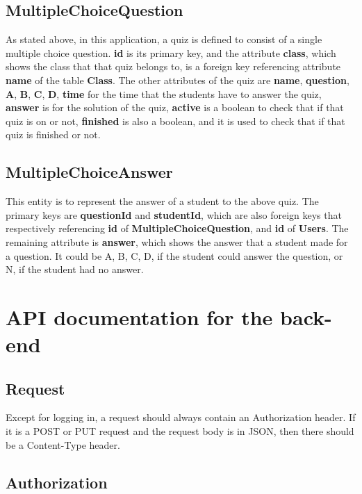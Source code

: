 \documentclass[a4paper, 11pt,openany]{book} %
\begin{document}
\subsection{MultipleChoiceQuestion}
As stated above, in this application, a quiz is defined to consist of a single multiple choice question. \textbf{id} is its primary key, and the attribute \textbf{class}, which shows the class that that quiz belongs to, is a foreign key referencing attribute \textbf{name} of the table \textbf{Class}. The other attributes of the quiz are \textbf{name}, \textbf{question}, \textbf{A}, \textbf{B}, \textbf{C}, \textbf{D}, \textbf{time} for the time that the students have to answer the quiz, \textbf{answer} is for the solution of the quiz, \textbf{active} is a boolean to check that if that quiz is on or not, \textbf{finished} is also a boolean, and it is used to check that if that quiz is finished or not.

\subsection{MultipleChoiceAnswer}
This entity is to represent the answer of a student to the above quiz. The primary keys are \textbf{questionId} and \textbf{studentId}, which are also foreign keys that respectively referencing \textbf{id} of \textbf{MultipleChoiceQuestion}, and \textbf{id} of \textbf{Users}. The remaining attribute is \textbf{answer}, which shows the answer that a student made for a question. It could be A, B, C, D, if the student could answer the question, or N, if the student had no answer.
\section{API documentation for the back-end}

\subsection{Request}
Except for logging in, a request should always contain an Authorization header. If it is a POST or PUT request and the request body is in JSON, then there should be a Content-Type header.

\subsection{Authorization}
\end{document}
